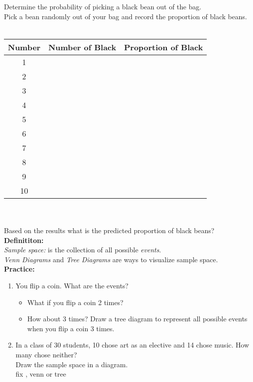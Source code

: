 \documentclass[12pt]{article}
\begin{document}
Determine the probability of picking a black bean out of the bag. \\

 Pick a bean randomly out of your bag and record the proportion of black beans. \\
\\
\begin{tabular}{| c | c | r |}
 \hline 
Number & Number of Black & Proportion of Black \\  \hline 
1 &  & \\ \hline 
2 & & \\ \hline 
3 & & \\ \hline 
4 & & \\  \hline 
5 & & \\  \hline 
6 & & \\ \hline 
7 & & \\ \hline 
8 & & \\ \hline 
9 & & \\ \hline 
10 & & \\ \hline 
\end{tabular}
\\
\\
Based on the results what is the predicted proportion of black beans? \\

\textbf{Definititon:}\\

\textit{Sample space:}  is the collection of all possible \textit{events}. \\

\textit{Venn Diagrams} and \textit{ Tree Diagrams} are ways to visualize sample space.
\\

\textbf{Practice:}

\begin{enumerate}
\item You flip a coin. What are the events?\\

\begin{itemize}
 \item What if you flip a coin 2 times?\\
 
 \item How about 3 times? Draw a tree diagram to represent all possible events when you flip a coin 3 times.\\
\vspace{5em}

  \end{itemize}
  
\item In a class of 30 students, 10 chose art as an elective and 14 chose music. How many chose neither?\\
Draw the sample space in a diagram.\\ fix , venn  or tree

 \end{enumerate}
 
\end{document}
